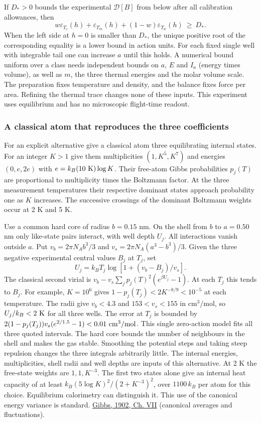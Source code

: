 \documentclass[11pt,a4paper]{article}
\begin{document}
If \(D_*>0\) bounds the experimental \(\mathcal D[B]\) from below after
all calibration allowances, then \[
 w\varepsilon_{T_c}(h)+\varepsilon_{T_m}(h)
 +(1-w)\varepsilon_{T_w}(h)\ \ge\ D_* .
\] When the left side at \(h=0\) is smaller than \(D_*\), the unique
positive root of the corresponding equality is a lower bound in action
units. For each fixed single well with integrable tail one can increase
\(a\) until this holds. A numerical bound uniform over a class needs
independent bounds on \(a\), \(E\) and \(I_a\) (energy times volume), as
well as \(m\), the three thermal energies and the molar volume scale.
The preparation fixes temperature and density, and the balance fixes
force per area. Refining the thermal trace changes none of these inputs.
This experiment uses equilibrium and has no microscopic flight-time
readout.

\subsubsection{A classical atom that reproduces the three
coefficients}\label{a-classical-atom-that-reproduces-the-three-coefficients}

For an explicit alternative give a classical atom three equilibrating
internal states. For an integer \(K>1\) give them multiplicities
\((1,K^5,K^7)\) and energies \((0,e,2e)\) with
\(e=k_B(10\ {\rm K})\log K\). Their free-atom Gibbs probabilities
\(p_j(T)\) are proportional to multiplicity times the Boltzmann factor.
At the three measurement temperatures their respective dominant states
approach probability one as \(K\) increases. The successive crossings of
the dominant Boltzmann weights occur at 2 K and 5 K.

Use a common hard core of radius \(b=0.15\) nm. On the shell from \(b\)
to \(a=0.50\) nm only like-state pairs interact, with well depth
\(U_j\). All interactions vanish outside \(a\). Put
\(v_b=2\pi N_A b^3/3\) and \(v_s=2\pi N_A(a^3-b^3)/3\). Given the three
negative experimental central values \(B_j\) at \(T_j\), set \[
 U_j=k_BT_j\log[1+(v_b-B_j)/v_s].
\] The classical second virial is
\(v_b-v_s\sum_j p_j(T)^2(e^{\beta U_j}-1)\). At each \(T_j\) this tends
to \(B_j\). For example, \(K=10^6\) gives
\(1-p_j(T_j)<2K^{-8/9}<10^{-5}\) at each temperature. The radii give
\(v_b<4.3\) and \(153<v_s<155\) in \(\mathrm{cm^3/mol}\), so
\(U_j/k_B<2\ {\rm K}\) for all three wells. The error at \(T_j\) is
bounded by \(2(1-p_j(T_j))v_s(e^{2/1.5}-1)<0.01\ {\rm cm^3/mol}\). This
single zero-action model fits all three quoted intervals. The hard core
bounds the number of neighbours in the shell and makes the gas stable.
Smoothing the potential steps and taking steep repulsion changes the
three integrals arbitrarily little. The internal energies,
multiplicities, shell radii and well depths are inputs of this
alternative. At 2 K the free-state weights are \(1,1,K^{-3}\). The first
two states alone give an internal heat capacity of at least
\(k_B(5\log K)^2/(2+K^{-3})^2\), over \(1100\,k_B\) per atom for this
choice. Equilibrium calorimetry can distinguish it. This use of the
canonical energy variance is standard.
\href{https://en.wikisource.org/wiki/Elementary_Principles_in_Statistical_Mechanics/Chapter_VII}{Gibbs,
1902, Ch. VII} (canonical averages and fluctuations).
\end{document}
